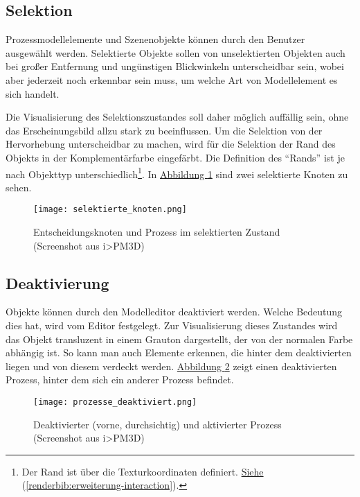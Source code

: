 \documentclass[a4paper,10pt]{sphinxmanual}
\begin{document}
\subsection{Selektion}
\label{visualisierung:selektion}
Prozessmodellelemente und Szenenobjekte können durch den Benutzer ausgewählt werden.
Selektierte Objekte sollen von unselektierten Objekten auch bei großer Entfernung und ungünstigen Blickwinkeln unterscheidbar sein, wobei aber jederzeit noch erkennbar sein muss, um welche Art von Modellelement es sich handelt.

Die Visualisierung des Selektionszustandes soll daher möglich auffällig sein, ohne das Erscheinungsbild allzu stark zu beeinflussen.
Um die Selektion von der Hervorhebung unterscheidbar zu machen, wird für die Selektion der Rand des Objekts in der Komplementärfarbe eingefärbt. Die Definition des "`Rands"' ist je nach Objekttyp unterschiedlich\footnote{
Der Rand ist über die Texturkoordinaten definiert. {\hyperref[renderbib:erweiterung-interaction]{Siehe}} (\autoref*{renderbib:erweiterung-interaction}).
}.
In \hyperref[visualisierung:selektion-sc]{Abbildung  \ref*{visualisierung:selektion-sc}} sind zwei selektierte Knoten zu sehen.
\begin{figure}[htbp]
\centering
\capstart

\texttt{[image: selektierte\_knoten.png]}
\caption{Entscheidungsknoten und Prozess im selektierten Zustand (Screenshot aus i\textgreater{}PM3D)}\label{visualisierung:selektion-sc}\end{figure}


\subsection{Deaktivierung}
\label{visualisierung:deaktivierung}\label{visualisierung:id5}
Objekte können durch den Modelleditor deaktiviert werden. Welche Bedeutung dies hat, wird vom Editor festgelegt.
Zur Visualisierung dieses Zustandes wird das Objekt transluzent in einem Grauton dargestellt, der von der normalen Farbe abhängig ist.
So kann man auch Elemente erkennen, die hinter dem deaktivierten liegen und von diesem verdeckt werden.
\hyperref[visualisierung:deaktivierung-sc]{Abbildung  \ref*{visualisierung:deaktivierung-sc}} zeigt einen deaktivierten Prozess, hinter dem sich ein anderer Prozess befindet.
\begin{figure}[htbp]
\centering
\capstart

\texttt{[image: prozesse\_deaktiviert.png]}
\caption{Deaktivierter (vorne, durchsichtig) und aktivierter Prozess (Screenshot aus i\textgreater{}PM3D)}\label{visualisierung:deaktivierung-sc}\end{figure}
\end{document}
